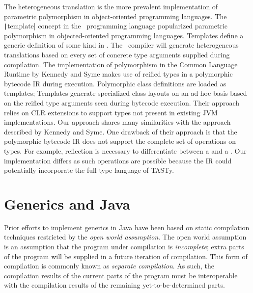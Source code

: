 The heterogeneous translation is the more prevalent implementation of parametric polymorphism in object-oriented programming languages.
The \texttt|template| concept in the \CC\ programming language popularized parametric polymorphism in objected-oriented programming languages.
Templates define a generic definition of some kind in \CC.
The \CC\ compiler will generate heterogeneous translations based on every set of concrete type arguments supplied during compilation.
The implementation of polymorphism in the Common Language Runtime\cite{clr:overview}\cite{clr:spec} by Kennedy and Syme makes use of reified types in a polymorphic bytecode IR during execution.
Polymorphic class definitions are loaded as templates; Templates generate specialized class layouts on an ad-hoc basis based on the reified type arguments seen during bytecode execution.
Their approach relies on CLR extensions to support types not present in existing JVM implementations.
Our approach shares many similarities with the approach described by Kennedy and Syme.
One drawback of their approach is that the polymorphic bytecode IR does not support the complete set of operations on types.
For example, reflection is necessary to differentiate between a  and a .
Our implementation differs as such operations are possible because the IR could potentially incorporate the full type language of TASTy.

\section{Generics and Java}

Prior efforts to implement generics in Java have been based on static compilation techniques restricted by the \textit{open world assumption}.
The open world assumption is an assumption that the program under compilation is \textit{incomplete}; extra parts of the program will be supplied in a future iteration of compilation.
This form of compilation is commonly known as \textit{separate compilation}.
As such, the compilation results of the current parts of the program must be interoperable with the compilation results of the remaining yet-to-be-determined parts.

